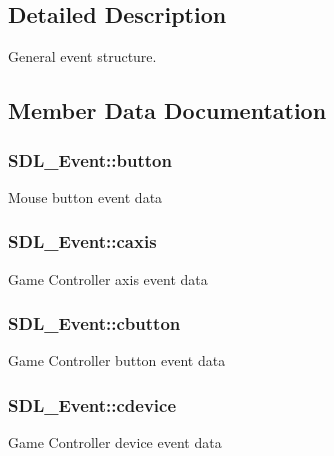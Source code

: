 \begin{DoxyCompactItemize}
\end{DoxyCompactItemize}


\subsection{Detailed Description}
General event structure. 

\subsection{Member Data Documentation}
\hypertarget{union_s_d_l___event_ab6da2fa2687e5f849f270adecc64785f}{}
\subsubsection[{button}]{ S\+D\+L\+\_\+\+Event\+::button}\label{union_s_d_l___event_ab6da2fa2687e5f849f270adecc64785f}
Mouse button event data \hypertarget{union_s_d_l___event_aa8f6df0f2716fae56204b12ab4a4c289}{}
\subsubsection[{caxis}]{ S\+D\+L\+\_\+\+Event\+::caxis}\label{union_s_d_l___event_aa8f6df0f2716fae56204b12ab4a4c289}
Game Controller axis event data \hypertarget{union_s_d_l___event_aee2b5671c8dcdb447023715cc21593cb}{}
\subsubsection[{cbutton}]{ S\+D\+L\+\_\+\+Event\+::cbutton}\label{union_s_d_l___event_aee2b5671c8dcdb447023715cc21593cb}
Game Controller button event data \hypertarget{union_s_d_l___event_ad3beed01e690b885728e0b0e1d636378}{}
\subsubsection[{cdevice}]{ S\+D\+L\+\_\+\+Event\+::cdevice}\label{union_s_d_l___event_ad3beed01e690b885728e0b0e1d636378}
Game Controller device event data \hypertarget{union_s_d_l___event_abe5cb8767f93de55163c8ddd4562a7f2}{}
